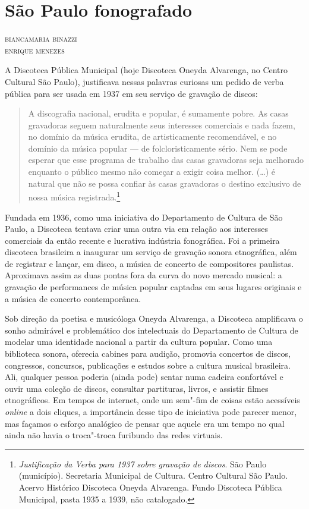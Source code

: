 \chapter*{São Paulo fonografado}

\begin{flushright}
\textsc{biancamaria binazzi\\ enrique menezes}
\end{flushright}

A Discoteca Pública Municipal (hoje Discoteca Oneyda Alvarenga, no
Centro Cultural São Paulo), justificava nessas palavras curiosas um
pedido de verba pública para ser usada em 1937 em seu serviço de
gravação de discos:

\begin{quote}
A discografia nacional, erudita e popular, é sumamente pobre. As casas
gravadoras seguem naturalmente seus interesses comerciais e nada fazem,
no domínio da música erudita, de artisticamente recomendável, e no
domínio da música popular --- de folcloristicamente sério. Nem se pode
esperar que esse programa de trabalho das casas gravadoras seja
melhorado enquanto o público mesmo não começar a exigir coisa melhor.
(\ldots{}) é natural que não se possa confiar às casas gravadoras o destino
exclusivo de nossa música registrada.\footnote{\emph{Justificação da
  Verba para 1937 sobre gravação de discos}. São Paulo (município).
  Secretaria Municipal de Cultura. Centro Cultural São Paulo. Acervo
  Histórico Discoteca Oneyda Alvarenga. Fundo Discoteca Pública
  Municipal, pasta 1935 a 1939, não catalogado.}
\end{quote}

Fundada em 1936, como uma iniciativa do Departamento de Cultura de São
Paulo, a Discoteca tentava criar uma outra via em relação aos interesses
comerciais da então recente e lucrativa indústria fonográfica. Foi a
primeira discoteca brasileira a inaugurar um serviço de gravação sonora
etnográfica, além de registrar e lançar, em disco, a música de concerto
de compositores paulistas. Aproximava assim as duas pontas fora da curva do novo mercado musical: a gravação de
performances de música popular captadas em seus lugares originais e a
música de concerto contemporânea.

Sob direção da poetisa e musicóloga Oneyda Alvarenga, a Discoteca
amplificava o sonho admirável e problemático dos intelectuais do
Departamento de Cultura de modelar uma identidade nacional a partir da
cultura popular. Como uma biblioteca sonora, oferecia cabines para
audição, promovia concertos de discos, congressos, concursos,
publicações e estudos sobre a cultura musical brasileira. Ali, qualquer pessoa
poderia (ainda pode) sentar numa cadeira confortável e ouvir uma coleção
de discos, consultar partituras, livros, e assistir filmes etnográficos. Em
tempos de internet, onde um sem"-fim de coisas estão acessíveis
\emph{online} a dois cliques, a importância desse tipo de iniciativa
pode parecer menor, mas façamos o esforço analógico de pensar que aquele
era um tempo no qual ainda não havia o troca"-troca furibundo das redes
virtuais.

